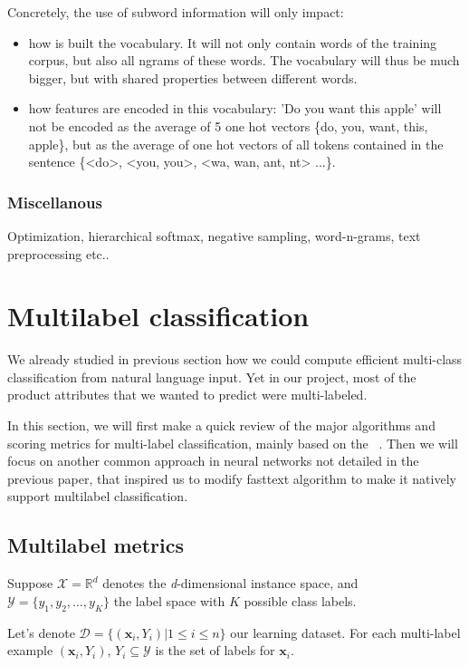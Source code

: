 Concretely, the use of subword information will only impact:
\begin{itemize}
	\item how is built the vocabulary. It will not only contain words of the training corpus, but also all ngrams of these words. The vocabulary will thus be much bigger, but with shared properties between different words.
	\item how features are encoded in this vocabulary: 'Do you want this apple' will not be encoded as the average of 5 one hot vectors \{do, you, want, this, apple\}, but as the average of one hot vectors of all tokens contained in the sentence \{<do>, <you, you>, <wa, wan, ant, nt> ...\}.
\end{itemize}

\subsubsection{Miscellanous}

Optimization, hierarchical softmax, negative sampling, word-n-grams, text preprocessing etc..


\pagebreak
\section{Multilabel classification}

We already studied in previous section how we could compute efficient multi-class classification from natural language input. Yet in our project, most of the product attributes that we wanted to predict were multi-labeled.

In this section, we will first make a quick review of the major algorithms and scoring metrics for multi-label classification, mainly based on the ~\cite[following paper]{MultilabelReview}. Then we will focus on another common approach in neural networks not detailed in the previous paper, that inspired us to modify fasttext algorithm to make it natively support multilabel classification.


\subsection{Multilabel metrics}

Suppose $\mathcal{X} = \mathbb{R}^d$ denotes the \textit{d}-dimensional instance space, and  $\mathcal{Y} = \{y_1, y_2, \dots, y_K \}$ the label space with $K$ possible class labels.

Let's denote $\mathcal{D} = \{(\mathbf{x}_i, Y_i) | 1 \leq i \leq n\}$ our learning dataset. For each multi-label example $(\mathbf{x}_i, Y_i)$, $Y_i \subseteq \mathcal{Y}$ is the set of labels for $\mathbf{x}_i$.

